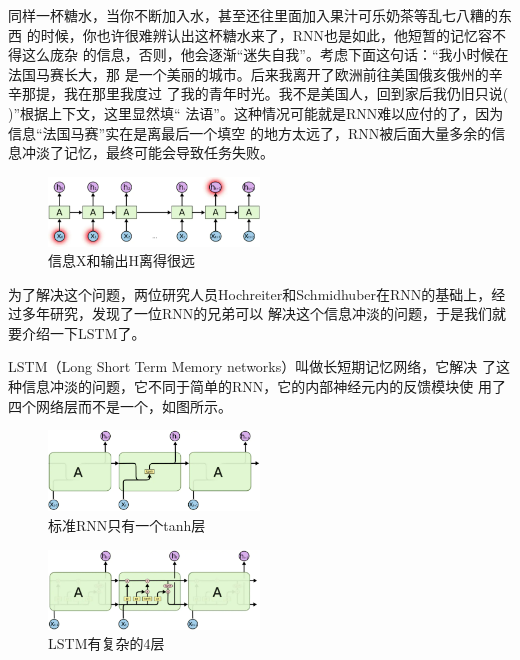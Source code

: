 \documentclass[11pt,a4paper]{elegantpaper}
\begin{document}
\begin{multicols}{2}
同样一杯糖水，当你不断加入水，甚至还往里面加入果汁可乐奶茶等乱七八糟的东西
的时候，你也许很难辨认出这杯糖水来了，RNN也是如此，他短暂的记忆容不得这么庞杂
的信息，否则，他会逐渐“迷失自我”。考虑下面这句话：“我小时候在法国马赛长大，那
是一个美丽的城市。后来我离开了欧洲前往美国俄亥俄州的辛辛那提，我在那里我度过
了我的青年时光。我不是美国人，回到家后我仍旧只说(   )”根据上下文，这里显然填“
法语”。这种情况可能就是RNN难以应付的了，因为信息“法国马赛”实在是离最后一个填空
的地方太远了，RNN被后面大量多余的信息冲淡了记忆，最终可能会导致任务失败。


\begin{figure}[H]
  \centering
  \includegraphics[width=0.5\textwidth]{images/XH2.png}
  \caption{信息X和输出H离得很远} 
\end{figure}

为了解决这个问题，两位研究人员Hochreiter和Schmidhuber在RNN的基础上，经过多年研究，发现了一位RNN的兄弟可以
解决这个信息冲淡的问题，于是我们就要介绍一下LSTM了。

LSTM（Long Short Term Memory networks）叫做长短期记忆网络，它解决
了这种信息冲淡的问题，它不同于简单的RNN，它的内部神经元内的反馈模块使
用了四个网络层而不是一个，如图所示。

\begin{figure}[H]
  \centering
  \includegraphics[width=0.5\textwidth]{images/LSTM.png}
  \caption{标准RNN只有一个tanh层} 
\end{figure}

\begin{figure}[H]
  \centering
  \includegraphics[width=0.5\textwidth]{images/LLLL.png}
  \caption{LSTM有复杂的4层} 
\end{figure}


\end{multicols}
\end{document}

